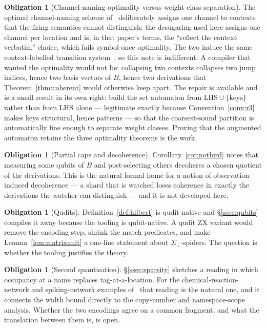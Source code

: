 \documentclass[11pt]{article}
\theoremstyle{definition}
\newtheorem{obligation}[definition]{Obligation}
\theoremstyle{plain}
\newcommand{\Tags}{\Sigma}
\newcommand{\Tagsb}{\Tags_{\bot}}
\begin{document}
\begin{obligation}[Channel-naming optimality versus weight-class separation]\label{ob:optimal}
The optimal channel-naming scheme of~\cite{optimal} deliberately assigns one channel to contexts
that the firing semantics cannot distinguish; the desugaring used here assigns one channel per
location and is, in that paper's terms, the ``reflect the context verbatim'' choice, which fails
symbol-once optimality. The two induce the same context-labelled transition
system~\cite[Rem.~4.6]{knotted}, so this note is indifferent. A compiler that wanted the
optimality would not be: collapsing two contexts collapses two jump indices, hence two basis
vectors of $B$, hence two derivations that Theorem~\ref{thm:coherent} would otherwise keep apart.
The repair is available and is a small result in its own right: build the set automaton from
$\mathrm{LHS}\cup\{\text{keys}\}$ rather than from $\mathrm{LHS}$ alone --- legitimate exactly
because Convention~\ref{conv:r3} makes keys structural, hence patterns --- so that the
coarsest-sound partition is automatically fine enough to separate weight classes. Proving that
the augmented automaton retains the three optimality theorems is the work.
\end{obligation}

\begin{obligation}[Partial caps and decoherence]\label{ob:partial}
Corollary~\ref{cor:nothird} notes that measuring some qubits of $B$ and post-selecting others
decoheres a chosen quotient of the derivations. This is the natural formal home for a notion of
observation-induced decoherence --- a shard that is watched loses coherence in exactly the
derivations the watcher can distinguish --- and it is not developed here.
\end{obligation}

\begin{obligation}[Qudits]\label{ob:qudits}
Definition~\ref{def:hilbert} is qudit-native and \S\ref{ssec:qubits} compiles it away because the
tooling is qubit-native. A qudit ZX variant would remove the encoding step, shrink the match
predicates, and make Lemma~\ref{lem:matrixunit} a one-line statement about $\Tagsb$-spiders. The
question is whether the tooling justifies the theory.
\end{obligation}

\begin{obligation}[Second quantisation]\label{ob:secondq}
\S\ref{ssec:sparsity} sketches a reading in which occupancy at a name replaces tag-at-a-location.
For the chemical-reaction-network and spiking-network examples of~\cite{weighted} that reading is
the natural one, and it connects the width bound directly to the copy-number and namespace-scope
analysis. Whether the two encodings agree on a common fragment, and what the translation between
them is, is open.
\end{obligation}
\end{document}
